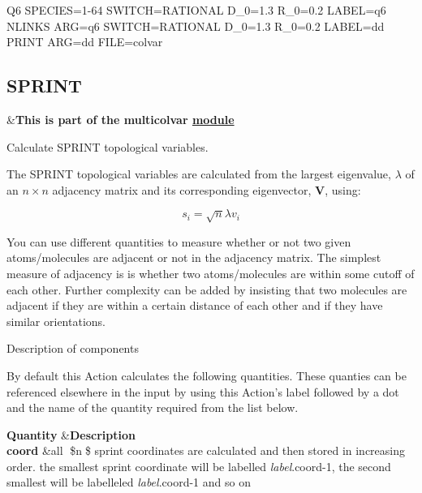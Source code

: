 \begin{DoxyVerb}Q6 SPECIES=1-64 SWITCH={RATIONAL D_0=1.3 R_0=0.2} LABEL=q6
NLINKS ARG=q6 SWITCH={RATIONAL D_0=1.3 R_0=0.2} LABEL=dd
PRINT ARG=dd FILE=colvar
\end{DoxyVerb}
 \hypertarget{SPRINT}{}\subsection{S\+P\+R\+I\+N\+T}\label{SPRINT}
\begin{TabularC}{2}
\hline
&{\bfseries  This is part of the multicolvar \hyperlink{mymodules}{module }}   \\
\end{TabularC}
Calculate S\+P\+R\+I\+N\+T topological variables.

The S\+P\+R\+I\+N\+T topological variables are calculated from the largest eigenvalue, $\lambda$ of an $n\times n$ adjacency matrix and its corresponding eigenvector, $\mathbf{V}$, using\+:

\[ s_i = \sqrt{n} \lambda v_i \]

You can use different quantities to measure whether or not two given atoms/molecules are adjacent or not in the adjacency matrix. The simplest measure of adjacency is is whether two atoms/molecules are within some cutoff of each other. Further complexity can be added by insisting that two molecules are adjacent if they are within a certain distance of each other and if they have similar orientations.

\begin{DoxyParagraph}{Description of components}

\end{DoxyParagraph}
By default this Action calculates the following quantities. These quanties can be referenced elsewhere in the input by using this Action's label followed by a dot and the name of the quantity required from the list below.

\begin{TabularC}{2}
\hline
{\bfseries  Quantity }  &{\bfseries  Description }   \\
{\bfseries  coord } &all \$n\$ sprint coordinates are calculated and then stored in increasing order. the smallest sprint coordinate will be labelled {\itshape label}.coord-\/1, the second smallest will be labelleled {\itshape label}.coord-\/1 and so on   \\
\end{TabularC}


